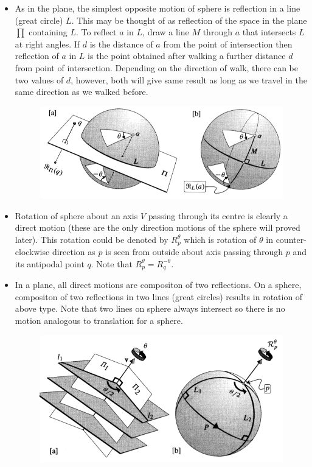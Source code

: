 \documentclass[12pt]{article}
\begin{document}
\begin{itemize}
    \item As in the plane, the simplest opposite motion of sphere is reflection in a line (great circle) $L$. This may be thought of as reflection of the space in the plane $\prod$ containing $L$. To reflect $a$ in $L$, draw a line $M$ through $a$ that intersects $L$ at right angles. If $d$ is the distance of $a$ from the point of intersection then reflection of $a$ in $L$ is the point obtained after walking a further distance $d$ from point of intersection. Depending on the direction of walk, there can be two values of $d$, however, both will give same result as long as we travel in the same direction as we walked before.

    \begin{figure}[h!]
        \centering
        \includegraphics[scale=0.7]{fig_4}
        \label{fig_4}
    \end{figure}

    \item Rotation of sphere about an axis $V$ passing through its centre is clearly a direct motion (these are the only direction motions of the sphere will proved later). This rotation could be denoted by $R^{\theta}_{p}$ which is rotation of $\theta$ in counter-clockwise direction as $p$ is seen from outside about axis passing through $p$ and its antipodal point $q$. Note that $R^{\theta}_{p} = R^{-\theta}_{q}$.
    
    \item In a plane, all direct motions are compositon of two reflections. On a sphere, compositon of two reflections in two lines (great circles) results in rotation of above type. Note that two lines on sphere always intersect so there is no motion analogous to translation for a sphere.
    
    \begin{figure}[h!]
        \centering
        \includegraphics[scale=0.7]{fig_5}
        \label{fig_5}
    \end{figure}


\end{itemize}
\end{document}
